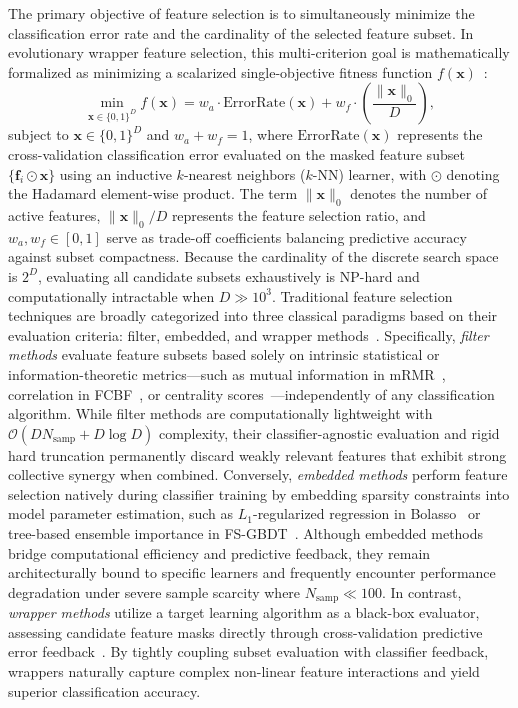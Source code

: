 The primary objective of feature selection is to simultaneously minimize the classification error rate and the cardinality of the selected feature subset. In evolutionary wrapper feature selection, this multi-criterion goal is mathematically formalized as minimizing a scalarized single-objective fitness function $f(\mathbf{x})$~\cite{miao2024,deng2025nns}:
\begin{equation}
\min_{\mathbf{x} \in \{0, 1\}^D} f(\mathbf{x}) = w_a \cdot \mathrm{ErrorRate}(\mathbf{x}) + w_f \cdot \left(\frac{\|\mathbf{x}\|_0}{D}\right),
\label{eq:fs_formulation}
\end{equation}
subject to $\mathbf{x} \in \{0, 1\}^D$ and $w_a + w_f = 1$, where $\mathrm{ErrorRate}(\mathbf{x})$ represents the cross-validation classification error evaluated on the masked feature subset $\{\mathbf{f}_i \odot \mathbf{x}\}$ using an inductive $k$-nearest neighbors ($k\text{-NN}$) learner, with $\odot$ denoting the Hadamard element-wise product. The term $\|\mathbf{x}\|_0$ denotes the number of active features, $\|\mathbf{x}\|_0 / D$ represents the feature selection ratio, and $w_a, w_f \in [0, 1]$ serve as trade-off coefficients balancing predictive accuracy against subset compactness. Because the cardinality of the discrete search space is $2^D$, evaluating all candidate subsets exhaustively is NP-hard and computationally intractable when $D \gg 10^3$. Traditional feature selection techniques are broadly categorized into three classical paradigms based on their evaluation criteria: filter, embedded, and wrapper methods~\cite{guyon2003,kohavi1997}. Specifically, \textit{filter methods} evaluate feature subsets based solely on intrinsic statistical or information-theoretic metrics---such as mutual information in mRMR~\cite{peng2005}, correlation in FCBF~\cite{yu2003}, or centrality scores~\cite{roffo2016}---independently of any classification algorithm. While filter methods are computationally lightweight with $\mathcal{O}(D N_{\mathrm{samp}} + D \log D)$ complexity, their classifier-agnostic evaluation and rigid hard truncation permanently discard weakly relevant features that exhibit strong collective synergy when combined. Conversely, \textit{embedded methods} perform feature selection natively during classifier training by embedding sparsity constraints into model parameter estimation, such as $L_1$-regularized regression in Bolasso~\cite{bach2008} or tree-based ensemble importance in FS-GBDT~\cite{zhang2021fsgbdt}. Although embedded methods bridge computational efficiency and predictive feedback, they remain architecturally bound to specific learners and frequently encounter performance degradation under severe sample scarcity where $N_{\mathrm{samp}} \ll 100$. In contrast, \textit{wrapper methods} utilize a target learning algorithm as a black-box evaluator, assessing candidate feature masks directly through cross-validation predictive error feedback~\cite{kohavi1997,miao2024}. By tightly coupling subset evaluation with classifier feedback, wrappers naturally capture complex non-linear feature interactions and yield superior classification accuracy.

